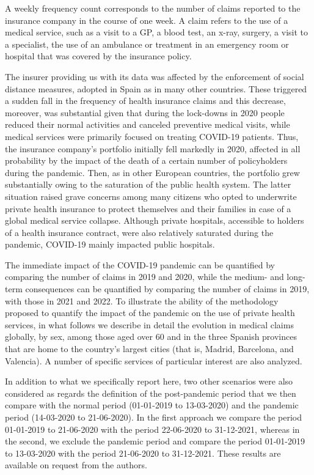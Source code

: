 \documentclass[]{risa}
\begin{document}
A weekly frequency count corresponds to the number of claims reported to the insurance company in the course of one week. A claim refers to the use of a medical service, such as a visit to a GP, a blood test, an x-ray, surgery, a visit to a specialist, the use of an ambulance or treatment in an emergency room or hospital that was covered by the insurance policy.

The insurer providing us with its data was affected by the enforcement of social distance measures, adopted in Spain as in many other countries. These triggered a sudden fall in the frequency of health insurance claims and this decrease, moreover, was substantial given that during the lock-downs in 2020 people reduced their normal activities and canceled preventive medical visits, while medical services were primarily focused on treating COVID-19 patients. Thus, the insurance company’s portfolio initially fell markedly in 2020, affected in all probability by the impact of the death of a certain number of policyholders during the pandemic. Then, as in other European countries, the portfolio grew substantially owing to the saturation of the public health system. The latter situation raised grave concerns among many citizens who opted to underwrite private health insurance to protect themselves and their families in case of a global medical service collapse. Although private hospitals, accessible to holders of a health insurance contract, were also relatively saturated during the pandemic, COVID-19 mainly impacted public hospitals.

The immediate impact of the COVID-19 pandemic can be quantified by comparing the number of claims in 2019 and 2020, while the medium- and long-term consequences can be quantified by comparing the number of claims in 2019, with those in 2021 and 2022. To illustrate the ability of the methodology proposed to quantify the impact of the pandemic on the use of private health services, in what follows we describe in detail the evolution in medical claims globally, by sex, among those aged over 60 and in the three Spanish provinces that are home to the country’s largest cities (that is, Madrid, Barcelona, and Valencia). A number of specific services of particular interest are also analyzed.

In addition to what we specifically report here, two other scenarios were also considered as regards the definition of the post-pandemic period that we then compare with the normal period (01-01-2019 to 13-03-2020) and the pandemic period (14-03-2020 to 21-06-2020). In the first approach we compare the period 01-01-2019 to 21-06-2020 with the period 22-06-2020 to 31-12-2021, whereas in the second, we exclude the pandemic period and compare the period 01-01-2019 to 13-03-2020 with the period 21-06-2020 to 31-12-2021. These results are available on request from the authors.
\end{document}
